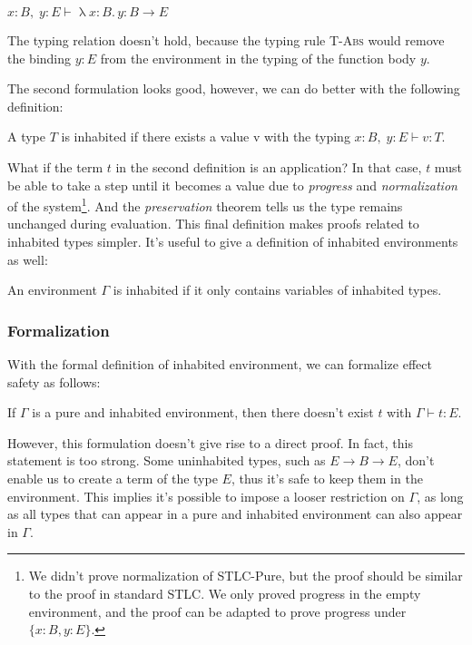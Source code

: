 \begin{center}
  $x:B, \; y:E \vdash \uplambda x{:}B {.}\, y : B \to E$
\end{center}

The typing relation doesn't hold, because the typing rule
\textsc{T-Abs} would remove the binding $y:E$ from the environment in
the typing of the function body $y$.

The second formulation looks good, however, we can do better with the
following definition:

\begin{definition}
  A type $T$ is inhabited if there exists a value v with the typing
  $x:B, \; y:E \vdash v : T$.
\end{definition}

What if the term $t$ in the second definition is an application? In
that case, $t$ must be able to take a step until it becomes a value
due to \emph{progress} and \emph{normalization} of the
system\footnote{We didn't prove normalization of STLC-Pure, but the
  proof should be similar to the proof in standard STLC. We only
  proved progress in the empty environment, and the proof can be
  adapted to prove progress under $\{x:B, y:E\}$.}. And the
\emph{preservation} theorem tells us the type remains unchanged during
evaluation. This final definition makes proofs related to inhabited
types simpler. It's useful to give a definition of inhabited
environments as well:

\begin{definition}
  An environment $\Gamma$ is inhabited if it only contains variables
  of inhabited types.
\end{definition}

\subsubsection{Formalization}

With the formal definition of inhabited environment, we can formalize
effect safety as follows:

\begin{definition}
  If $\Gamma$ is a pure and inhabited environment, then there doesn't
  exist $t$ with $\Gamma \vdash t : E$.
\end{definition}

However, this formulation doesn't give rise to a direct proof. In
fact, this statement is too strong. Some uninhabited types, such as
$E \to B \to E$, don't enable us to create a term of the type $E$,
thus it's safe to keep them in the environment. This implies it's
possible to impose a looser restriction on $\Gamma$, as long as all
types that can appear in a pure and inhabited environment can also
appear in $\Gamma$.

